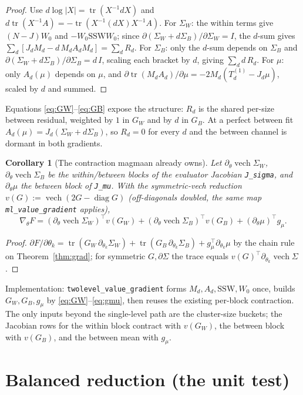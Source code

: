 \documentclass[11pt]{article}
\newcommand{\tr}{\operatorname{tr}}
\newcommand{\vech}{\operatorname{vech}}
\newcommand{\Sw}{\Sigma_W}
\newcommand{\Sb}{\Sigma_B}
\newcommand{\Md}{M_d}
\newcommand{\Rd}{R_d}
\newcommand{\SSW}{\mathrm{SSW}}
\theoremstyle{plain}
\newtheorem{corollary}{Corollary}
\theoremstyle{remark}
\begin{document}
\begin{proof}
Use $d\log|X|=\tr(X^{-1}dX)$ and $d\tr(X^{-1}A)=-\tr(X^{-1}(dX)X^{-1}A)$.
For $\Sw$: the within terms give $(N-J)W_0$ and $-W_0\SSW W_0$; since
$\partial(\Sw+d\Sb)/\partial\Sw=I$, the $d$-sum gives
$\sum_d[J_d\Md-d\,\Md A_d\Md]=\sum_d\Rd$. For $\Sb$: only the $d$-sum depends on
$\Sb$ and $\partial(\Sw+d\Sb)/\partial\Sb=d\,I$, scaling each bracket by $d$,
giving $\sum_d d\,\Rd$. For $\mu$: only $A_d(\mu)$ depends on $\mu$, and
$\partial\tr(\Md A_d)/\partial\mu=-2\Md(T^{(1)}_d-J_d\mu)$, scaled by $d$ and
summed.
\end{proof}

Equations \eqref{eq:GW}--\eqref{eq:GB} expose the structure: $\Rd$ is the shared
per-size between residual, weighted by $1$ in $G_W$ and by $d$ in $G_B$. At a
perfect between fit $A_d(\mu)=J_d(\Sw+d\Sb)$, so $\Rd=0$ for every $d$ and the
between channel is dormant in both gradients.

\begin{corollary}[The contraction magmaan already owns]
\label{cor:contract}
Let $\partial_\theta\vech\Sw$, $\partial_\theta\vech\Sb$ be the within/between
blocks of the evaluator Jacobian \texttt{J\_sigma}, and $\partial_\theta\mu$ the
between block of \texttt{J\_mu}. With the symmetric-vech reduction
$v(G):=\vech(2G-\operatorname{diag}G)$ (off-diagonals doubled, the same map
\texttt{ml\_value\_gradient} applies),
\[
\nabla_\theta F=(\partial_\theta\vech\Sw)^\top v(G_W)
              +(\partial_\theta\vech\Sb)^\top v(G_B)
              +(\partial_\theta\mu)^\top g_\mu .
\]
\end{corollary}

\begin{proof}
$\partial F/\partial\theta_k=\tr(G_W\,\partial_{\theta_k}\Sw)
+\tr(G_B\,\partial_{\theta_k}\Sb)+g_\mu^\top\partial_{\theta_k}\mu$ by the chain
rule on Theorem~\ref{thm:grad}; for symmetric $G,\partial\Sigma$ the trace equals
$v(G)^\top\partial_{\theta_k}\vech\Sigma$.
\end{proof}

Implementation: \texttt{twolevel\_value\_gradient} forms $M_d,A_d,\SSW,W_0$ once,
builds $G_W,G_B,g_\mu$ by \eqref{eq:GW}--\eqref{eq:gmu}, then reuses the existing
per-block contraction. The only inputs beyond the single-level path are the
cluster-size buckets; the Jacobian rows for the within block contract with
$v(G_W)$, the between block with $v(G_B)$, and the between mean with $g_\mu$.

\section{Balanced reduction (the unit test)}
\label{sec:muml}
\end{document}
